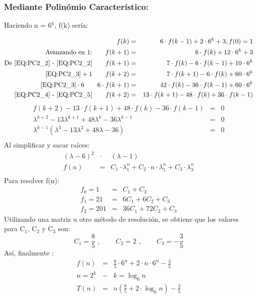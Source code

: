 	\subsubsection{Mediante Polinómio Característico:}
		\begin{center}	
			Haciendo n = 6$^{k}$, f(k) sería:
		\end{center}
		\begin{eqnarray}
			\label{EQ:PC2_1}f(k) &=& 6 \cdot f(k-1) + 2 \cdot 6^{k} + 3, f(0) = 1\\
			\label{EQ:PC2_2}\text{Avanzando en 1:}\qquad f(k+1) &=& 6 \cdot f(k) + 12 \cdot 6^{k} + 3\\
			\label{EQ:PC2_3}\text{De \ref{EQ:PC2_2} - \ref{EQ:PC2_2}}  \qquad f(k+1) &=& 7 \cdot f(k) - 6 \cdot f(k-1) + 10 \cdot 6^{k}\\
			\label{EQ:PC2_4}\text{\ref{EQ:PC2_3}}+1 \qquad f(k+2) &=& 7 \cdot f(k+1) - 6 \cdot f(k) + 60 \cdot 6^{k}\\
			\label{EQ:PC2_5}\text{\ref{EQ:PC2_3}}\cdot6 \qquad 6 \cdot f(k+1) &=& 42 \cdot f(k) - 36 \cdot f(k-1) + 60 \cdot 6^{k}\\
			\label{EQ:PC2_6}\text{\ref{EQ:PC2_4} - \ref{EQ:PC2_5}} \qquad f(k+2) &=& 13 \cdot f(k+1) - 48 \cdot f(k) + 36 \cdot f(k-1)
		\end{eqnarray}
		\begin{eqnarray*}
			f(k+2) - 13 \cdot f(k+1) + 48 \cdot f(k) - 36 \cdot f(k-1) &=& 0\\
			\lambda^{k+2} - 13 \lambda^{k+1} + 48 \lambda^{k} - 36 \lambda^{k-1} &=& 0\\
			\lambda^{k-1}(\lambda^3 - 13\lambda^2 + 48\lambda - 36) &=& 0\\
		\end{eqnarray*}
		Al simplificar y sacar raíces:
		\begin{eqnarray*}
			(\lambda - 6)^2 &\cdot &(\lambda - 1)\\
			f(n) &=& C_1 \cdot \lambda_{1}^{n} + C_2 \cdot n \cdot \lambda_{1}^{n} + C_3 \cdot \lambda_{3}^{n}\\
		\end{eqnarray*}
		Para resolver f(n):
		\begin{eqnarray*}
			f_0 = 1 &=& C_1 + C_3\\
			f_1 = 21 &=& 6C_1 + 6C_2 + C_3\\
			f_2 = 201 &=& 36C_1 + 72C_2 + C_3
		\end{eqnarray*}
		Utilizando una matriz u otro método de resolución, se obtiene que los valores para C$_1$, C$_2$ y C$_3$ son:
		\begin{equation*}
			C_1 = \frac{8}{5} \text{ , } \qquad C_2 = 2 \text{ , } \qquad C_3 = - \frac{3}{5}
		\end{equation*}
		Así, finalmente :
		\begin{eqnarray*}
			f(n) &=& \frac{8}{5} \cdot 6^n + 2 \cdot n \cdot 6^n - \frac{3}{5}\\
			n = 2^k &-& k = \log_6 n\\
			T(n) &=& n \left( \frac{8}{5} + 2 \cdot \log_6 n\right) - \frac{3}{5}
		\end{eqnarray*}
		

